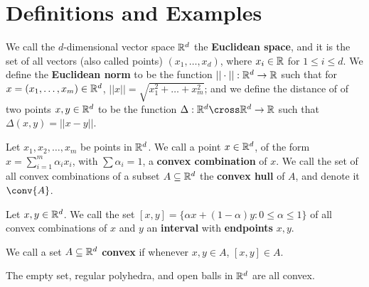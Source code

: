 
\section{Definitions and Examples}

\begin{definition}
    We call the $d$-dimensional vector space  $\mathbb{R}^d$ the  \textbf{Euclidean space}, and it is 
    the set of all vectors (also called points) $(x_1, \dots, x_d)$, where $x_i \in \mathbb{R}$ 
    for  $1 \leq i \leq d$. We define the \textbf{Euclidean norm} to be the function 
    $||\cdot||: \mathbb{R}^d \rightarrow \mathbb{R}$ such that for $x=(x_1, \dots, x_m) \in \mathbb{R}^d$, $||x||=\sqrt{x_1^2+\dots+x_m^2}$; 
    and we define the distance of of two points $x,y \in \mathbb{R}^d$ to be the function 
    $\Delta: \R^d \cross \R^d \rightarrow \R$ such that $\Delta(x,y)=||x-y||$.
\end{definition}

\begin{definition}
    Let $x_1,x_2, \dots, x_m$ be points in $\mathbb{R}^d$. We call a point  $x \in \mathbb{R}^d$, of the form 
   $x=\sum_{i=1}^{m}{\alpha_ix_i}$, with  $\sum{\alpha_i}=1$, a \textbf{convex combination} of $x$. We 
   call the set of all convex combinations of a subset  $A \subseteq \mathbb{R}^d$ the 
   \textbf{convex hull} of $A$, and denote it  $\conv{A}$.
\end{definition}

\begin{definition}
    Let $x,y  \in \mathbb{R}^d$. We call the set  $[x,y]=\{\alpha x+(1-\alpha)y: 0 \leq \alpha \leq 1\}$ of all 
    convex combinations of $x$ and  $y$ an \textbf{interval} with \textbf{endpoints}  $x, y$.

    We call a set  $A \subseteq \mathbb{R}^d$ \textbf{convex} if  whenever $x,y \in A$,  $[x,y] \in A$.
\end{definition}

\begin{example}
   The empty set, regular polyhedra, and open balls in $\mathbb{R}^d$ are all convex. 		
\end{example} 

